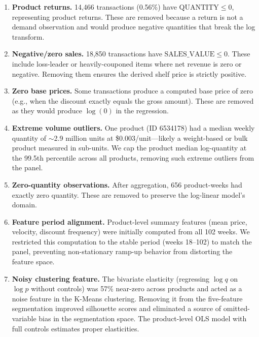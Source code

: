 \documentclass[12pt,a4paper]{article}
\begin{document}
\begin{enumerate}[nosep]
\item \textbf{Product returns.} 14,466 transactions (0.56\%) have
$\text{QUANTITY} \leq 0$, representing product returns. These are
removed because a return is not a demand observation and would
produce negative quantities that break the log transform.

\item \textbf{Negative/zero sales.} 18,850 transactions have
$\text{SALES\_VALUE} \leq 0$. These include loss-leader or
heavily-couponed items where net revenue is zero or negative.
Removing them ensures the derived shelf price is strictly positive.

\item \textbf{Zero base prices.} Some transactions produce a
computed base price of zero (e.g., when the discount exactly equals
the gross amount). These are removed as they would produce
$\log(0)$ in the regression.

\item \textbf{Extreme volume outliers.} One product (ID 6534178)
had a median weekly quantity of $\sim$2.9 million units at
\$0.003/unit---likely a weight-based or bulk product measured in
sub-units. We cap the product median log-quantity at the 99.5th
percentile across all products, removing such extreme outliers
from the panel.

\item \textbf{Zero-quantity observations.} After aggregation, 656
product-weeks had exactly zero quantity. These are removed to
preserve the log-linear model's domain.

\item \textbf{Feature period alignment.} Product-level summary
features (mean price, velocity, discount frequency) were initially
computed from all 102 weeks. We restricted this computation to the
stable period (weeks 18--102) to match the panel, preventing
non-stationary ramp-up behavior from distorting the feature space.

\item \textbf{Noisy clustering feature.} The bivariate elasticity
(regressing $\log q$ on $\log p$ without controls) was 57\%
near-zero across products and acted as a noise feature in the
K-Means clustering. Removing it from the five-feature segmentation
improved silhouette scores and eliminated a source of omitted-variable
bias in the segmentation space. The product-level OLS model with
full controls estimates proper elasticities.
\end{enumerate}
\end{document}
